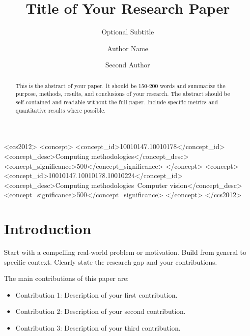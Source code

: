 \documentclass[sigconf]{acmart}
\begin{document}
\title{Title of Your Research Paper}
\subtitle{Optional Subtitle}

\author{Author Name}

\author{Second Author}

\begin{abstract}
This is the abstract of your paper. It should be 150-200 words and summarize the 
purpose, methods, results, and conclusions of your research. The abstract should 
be self-contained and readable without the full paper. Include specific metrics 
and quantitative results where possible.
\end{abstract}

\begin{CCSXML}
<ccs2012>
   <concept>
       <concept_id>10010147.10010178</concept_id>
       <concept_desc>Computing methodologies</concept_desc>
       <concept_significance>500</concept_significance>
       </concept>
   <concept>
       <concept_id>10010147.10010178.10010224</concept_id>
       <concept_desc>Computing methodologies~Computer vision</concept_desc>
       <concept_significance>500</concept_significance>
       </concept>
 </ccs2012>
\end{CCSXML}



\maketitle

\section{Introduction}
\label{sec:introduction}

Start with a compelling real-world problem or motivation. Build from general to 
specific context. Clearly state the research gap and your contributions.

The main contributions of this paper are:
\begin{itemize}
    \item Contribution 1: Description of your first contribution.
    \item Contribution 2: Description of your second contribution.
    \item Contribution 3: Description of your third contribution.
\end{itemize}
\end{document}
